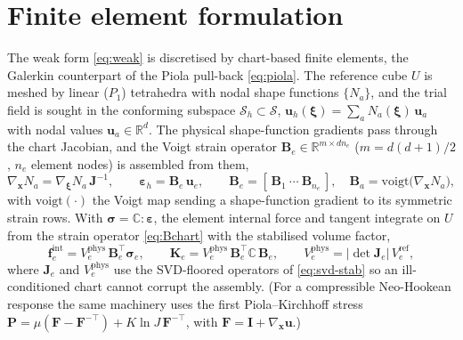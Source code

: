 \documentclass{svjour3}                 %
\newcommand{\R}{\mathbb{R}}
\newcommand{\abs}[1]{\lvert#1\rvert}
\newcommand{\xbf}{\bm{x}}
\newcommand{\ubf}{\bm{u}}
\newcommand{\fbf}{\bm{f}}
\newcommand{\grad}{\nabla}
\begin{document}
\section{Finite element formulation}\label{sec:discr}

The weak form \eqref{eq:weak} is discretised by chart-based finite elements, the Galerkin counterpart of the
Piola pull-back \eqref{eq:piola}. The reference cube $U$ is meshed by linear ($P_1$) tetrahedra with nodal shape
functions $\{N_a\}$, and the trial field is sought in the conforming subspace $\mathcal S_h\subset\mathcal S$,
$\ubf_h(\bm\xi)=\sum_a N_a(\bm\xi)\,\ubf_a$ with nodal values $\ubf_a\in\R^d$. The physical shape-function
gradients pass through the chart Jacobian, and the Voigt strain operator $\bm B_e\in\R^{m\times d n_e}$
($m=d(d{+}1)/2$, $n_e$ element nodes) is assembled from them,
\begin{equation}\label{eq:Bchart}
\grad_{\xbf}N_a=\grad_{\bm\xi}N_a\,\bm J^{-1},\qquad
\bm\varepsilon_h=\bm B_e\,\ubf_e,\qquad
\bm B_e=[\,\bm B_1\ \cdots\ \bm B_{n_e}\,],\quad
\bm B_a=\mathrm{voigt}\!\big(\grad_{\xbf}N_a\big),
\end{equation}
with $\mathrm{voigt}(\cdot)$ the Voigt map sending a shape-function gradient to its symmetric strain rows. With
$\bm\sigma=\mathbb C:\bm\varepsilon$, the element internal force and tangent integrate on $U$ from the strain operator \eqref{eq:Bchart} with the
stabilised volume factor,
\begin{equation}\label{eq:fem-assembly}
\fbf^{\mathrm{int}}_e=V_e^{\mathrm{phys}}\,\bm B_e^{\!\top}\bm\sigma_e,\qquad
\bm K_e=V_e^{\mathrm{phys}}\,\bm B_e^{\!\top}\mathbb C\,\bm B_e,\qquad
V_e^{\mathrm{phys}}=\abs{\det\bm J_e}\,V_e^{\mathrm{ref}} ,
\end{equation}
where $\bm J_e$ and $V_e^{\mathrm{phys}}$ use the SVD-floored operators of \eqref{eq:svd-stab} so an
ill-conditioned chart cannot corrupt the assembly. (For a compressible Neo-Hookean response the same
machinery uses the first Piola--Kirchhoff stress $\bm P=\mu(\bm F-\bm F^{-\top})+K\ln J\,\bm F^{-\top}$, with
$\bm F=\bm I+\grad_{\xbf}\ubf$.)
\end{document}
